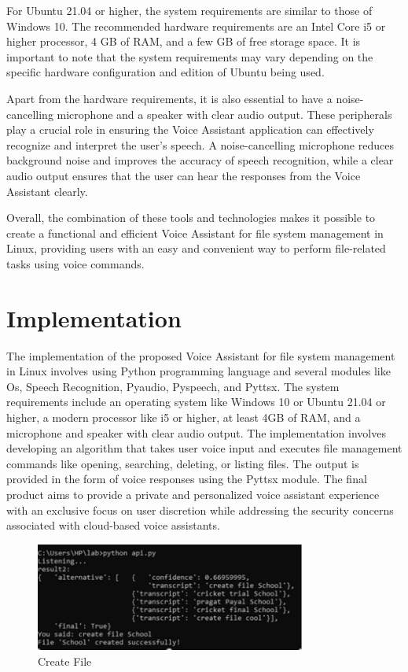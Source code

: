 \documentclass[conference]{IEEEtran}
\begin{document}
\par For Ubuntu 21.04 or higher, the system requirements are similar to those of Windows 10. The recommended hardware requirements are an Intel Core i5 or higher processor, 4 GB of RAM, and a few GB of free storage space. It is important to note that the system requirements may vary depending on the specific hardware configuration and edition of Ubuntu being used.

\par Apart from the hardware requirements, it is also essential to have a noise-cancelling microphone and a speaker with clear audio output. These peripherals play a crucial role in ensuring the Voice Assistant application can effectively recognize and interpret the user's speech. A noise-cancelling microphone reduces background noise and improves the accuracy of speech recognition, while a clear audio output ensures that the user can hear the responses from the Voice Assistant clearly.

\par Overall, the combination of these tools and technologies makes it possible to create a functional and efficient Voice Assistant for file system management in Linux, providing users with an easy and convenient way to perform file-related tasks using voice commands.


\section{Implementation}
The implementation of the proposed Voice Assistant for file system management in Linux involves using Python programming language and several modules like Os, Speech Recognition, Pyaudio, Pyspeech, and Pyttsx. The system requirements include an operating system like Windows 10 or Ubuntu 21.04 or higher, a modern processor like i5 or higher, at least 4GB of RAM, and a microphone and speaker with clear audio output. The implementation involves developing an algorithm that takes user voice input and executes file management commands like opening, searching, deleting, or listing files. The output is provided in the form of voice responses using the Pyttsx module. The final product aims to provide a private and personalized voice assistant experience with an exclusive focus on user discretion while addressing the security concerns associated with cloud-based voice assistants.
\begin{figure}[h]
\centering
\includegraphics[width=3.5in]{2.png}
\caption{Create File}
\label{fig:diagram}
\end{figure}
\end{document}
